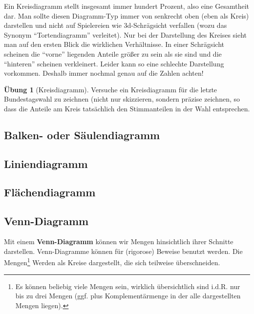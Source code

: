\documentclass[a4paper]{book}%
\theoremstyle{definition}
\newtheorem{uebung}{Übung}
\begin{document}
Ein Kreisdiagramm stellt insgesamt immer hundert Prozent, also eine Gesamtheit dar. Man sollte diesen Diagramm-Typ immer von senkrecht oben (eben als Kreis) darstellen und nicht auf Spielereien wie 3d-Schrägsicht verfallen (wozu das Synonym \enquote{Tortendiagramm} verleitet). Nur bei der Darstellung des Kreises sieht man auf den ersten Blick die wirklichen Verhältnisse. In einer Schrägsicht scheinen die \enquote{vorne} liegenden Anteile größer zu sein als sie sind und die \enquote{hinteren} scheinen verkleinert. Leider kann so eine schlechte Darstellung vorkommen. Deshalb immer nochmal genau auf die Zahlen achten!

\begin{uebung}[Kreisdiagramm]
    Versuche ein Kreisdiagramm für die letzte Bundestagswahl zu zeichnen (nicht nur skizzieren, sondern präzise zeichnen, so dass die Anteile am Kreis tatsächlich den Stimmanteilen in der Wahl entsprechen.
\end{uebung}

\subsection{Balken- oder Säulendiagramm}

\subsection{Liniendiagramm}

\subsection{Flächendiagramm}


\subsection{Venn-Diagramm}

Mit einem \textbf{Venn-Diagramm} können wir Mengen hinsichtlich ihrer Schnitte darstellen. Venn-Diagramme können für (rigorose) Beweise benutzt werden. Die Mengen\footnote{Es können beliebig viele Mengen sein, wirklich übersichtlich sind i.d.R. nur bis zu drei Mengen (ggf. plus Komplementärmenge in der alle dargestellten Mengen liegen).} Werden als Kreise dargestellt, die sich teilweise überschneiden.
\end{document}
